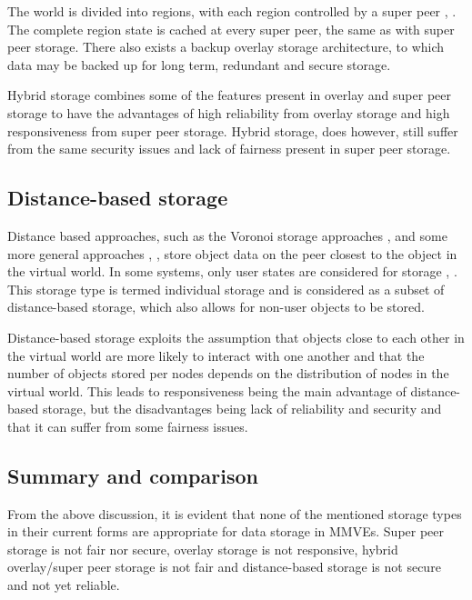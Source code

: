 \documentclass[10pt,a4paper,conference]{IEEEtran}
\begin{document}
The world is divided into regions, with each region controlled by a super peer \cite{zoned_federation}, \cite{hybrid_storage1}. The complete region
state is cached at every super peer, the same as with super peer storage. There also exists a backup overlay storage architecture, to which data may
be backed up for long term, redundant and secure storage.

Hybrid storage combines some of the features present in overlay and super peer storage to have the advantages of high reliability from overlay
storage and high responsiveness from super peer storage. Hybrid storage, does however, still suffer from the same security issues and lack of
fairness present in super peer storage.

\subsection{Distance-based storage}
\label{classic_distance_based}

Distance based approaches, such as the Voronoi storage approaches \cite{Buyukkaya_voronoi_state_management}, \cite{Hu_voronoi_IM} and some more
general approaches \cite{colyseus_distance_based}, \cite{solipsis}, store object data on the peer closest to the object in the virtual world. In some
systems, only user states are considered for storage \cite{individual_storage1}, \cite{cheat_proof_playout}. This storage type is termed individual
storage and is considered as a subset of distance-based storage, which also allows for non-user objects to be stored.

Distance-based storage exploits the assumption that objects close to each other in the virtual world are more likely to interact with one another and
that the number of objects stored per nodes depends on the distribution of nodes in the virtual world. This leads to responsiveness being the main
advantage of distance-based storage, but the disadvantages being lack of reliability and security and that it can suffer from some fairness issues.

\subsection{Summary and comparison}

From the above discussion, it is evident that none of the mentioned storage types in their current forms are appropriate for data storage in MMVEs.
Super peer storage is not fair nor secure, overlay storage is not responsive, hybrid overlay/super peer storage is not fair and distance-based
storage is not secure and not yet reliable.
\end{document}
